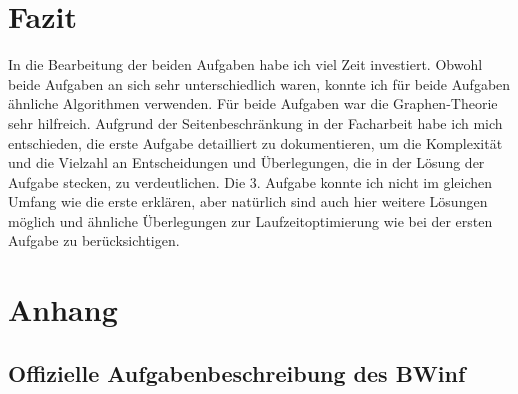 \documentclass[a4paper,12pt,arial]{scrartcl}
\begin{document}
\section{Fazit}
In die Bearbeitung der beiden Aufgaben habe ich viel Zeit investiert. Obwohl beide Aufgaben an sich sehr unterschiedlich waren, konnte ich für beide Aufgaben ähnliche Algorithmen verwenden. Für beide Aufgaben war die Graphen-Theorie sehr hilfreich. Aufgrund der Seitenbeschränkung in der Facharbeit habe ich mich entschieden, die erste Aufgabe detailliert zu dokumentieren, um die Komplexität und die Vielzahl an Entscheidungen und Überlegungen, die in der Lösung der Aufgabe stecken, zu verdeutlichen. Die 3. Aufgabe konnte ich  nicht im gleichen Umfang wie die erste erklären, aber natürlich sind auch hier weitere Lösungen möglich und ähnliche Überlegungen zur Laufzeitoptimierung wie bei der ersten Aufgabe zu berücksichtigen.  
\section{Anhang}
\subsection{Offizielle Aufgabenbeschreibung des BWinf}
\cite{bwinfSpielfeld}

\label{sec:aufgabenstellung}

\end{document}
